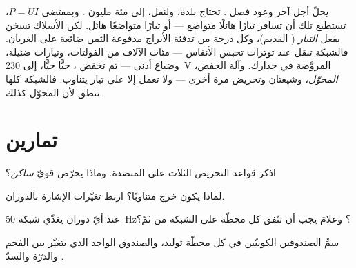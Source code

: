 \begin{remark}\label{rem:g9:alternator:transport}
يحلّ أجل آخر وعود فصل . تحتاج بلدة، ولنقل، إلى
مئة مليون . وبمقتضى $P = U I$، تستطيع تلك  أن تسافر
تيارًا هائلًا  متواضع --- أو تيارًا متواضعًا  هائل.
لكن الأسلاك تسخن بفعل \emph{التيار} ( القديم)، وكل
درجة من تدفئة الأبراج  مدفوعة الثمن ضائعة على الغربان.
فالشبكة تنقل عند توترات تحبس الأنفاس --- مئات الآلاف من
الفولتات، وتيارات ضئيلة، وضياع أدنى --- ثم تخفض ، حيًّا
حيًّا، إلى \qty{230}{V} المروَّضة في جدارك. وآلة الخفض،
\emph{المحوّل}، وشيعتان وتحريض مرة أخرى --- ولا تعمل إلا على
تيار يتناوب: فالشبكة كلها تنطق  لأن المحوّل
كذلك.
\end{remark}

\section{تمارين}

\begin{exercise}[$\star$]\label{exo:g9:alternator:1}
اذكر قواعد التحريض الثلاث على المنضدة. وماذا يحرّض 
قويّ \emph{ساكن}؟
\end{exercise}

\begin{exercise}[$\star$]\label{exo:g9:alternator:2}
لماذا يكون خرج  متناوبًا؟ اربط تغيّرات
الإشارة بالدوران.
\end{exercise}

\begin{exercise}[$\star$]\label{exo:g9:alternator:3}
عند أيّ  دوران يغذّي  شبكة \qty{50}{Hz}؟ وعلامَ
يجب أن تتّفق كل محطّة على الشبكة من ثمّ؟
\end{exercise}

\begin{exercise}[$\star$]\label{exo:g9:alternator:4}
سمِّ الصندوقين الكونيّين في كل محطّة توليد، والصندوق الواحد
الذي يتغيّر بين الفحم والذرّة والسدّ .
\end{exercise}

